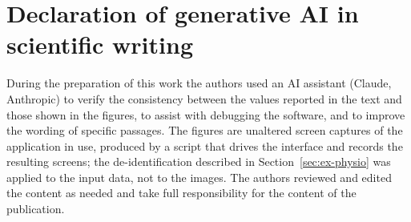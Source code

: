 \documentclass[11pt, letterpaper]{article}
\begin{document}
\section*{Declaration of generative AI in scientific writing}

During the preparation of this work the authors used an AI assistant (Claude, Anthropic) to verify the consistency between the values reported in the text and those shown in the figures, to assist with debugging the software, and to improve the wording of specific passages. The figures are unaltered screen captures of the application in use, produced by a script that drives the interface and records the resulting screens; the de-identification described in Section~\ref{sec:ex-physio} was applied to the input data, not to the images. The authors reviewed and edited the content as needed and take full responsibility for the content of the publication.



\end{document}
